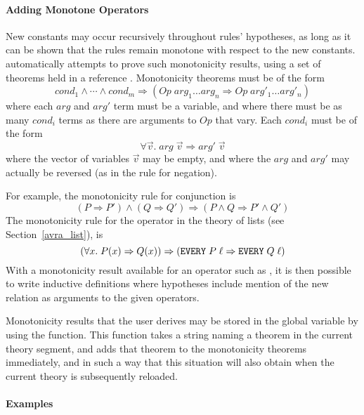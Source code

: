 \paragraph{Adding Monotone Operators}
New constants may occur recursively throughout rules' hypotheses, as
long as it can be shown that the rules remain monotone with respect to
the new constants.   automatically attempts to prove such
monotonicity results, using a set of theorems held in a reference
.  Monotonicity theorems must be of the form
\[
\mathit{cond}_1 \land \cdots \land \mathit{cond}_m \Rightarrow
(\mathit{Op}\;\mathit{arg}_1 \dots \mathit{arg}_n \Rightarrow
\mathit{Op}\;\mathit{arg}'_1 \dots \mathit{arg}'_n)
\]
where each $\mathit{arg}$ and $\mathit{arg}'$ term must be a variable,
and where there must be as many $\mathit{cond}_i$ terms as there are
arguments to $\mathit{Op}$ that vary.  Each $\mathit{cond}_i$ must be
of the form \[ \forall \vec{v}. \;\mathit{arg}\;\vec{v} \Rightarrow
\mathit{arg}'\;\vec{v}
\]
where the vector of variables $\vec{v}$ may be empty, and where the
$\mathit{arg}$ and $\mathit{arg}'$ may actually be reversed (as in the
rule for negation).

For example, the monotonicity rule for conjunction is
\[
(P \Rightarrow P') \land (Q \Rightarrow Q') \Rightarrow (P \land Q
\Rightarrow P' \land Q')
\]
The monotonicity rule for the  operator in the theory of
lists (see Section~\ref{avra_list}), is
\[
(\forall x. \;P(x) \Rightarrow Q(x)) \Rightarrow
(\holtxt{EVERY}\;P\;\ell \Rightarrow \holtxt{EVERY}\;Q\;\ell)
\]
With a monotonicity result available for an operator such as
, it is then possible to write inductive definitions
where hypotheses include mention of the new relation as arguments to
the given operators.

Monotonicity results that the user derives may be stored in the global
 variable by using the  function.
This function takes a string naming a theorem in the current theory
segment, and adds that theorem to the monotonicity theorems
immediately, and in such a way that this situation will also obtain when
the current theory is subsequently reloaded.

\paragraph{Examples}


